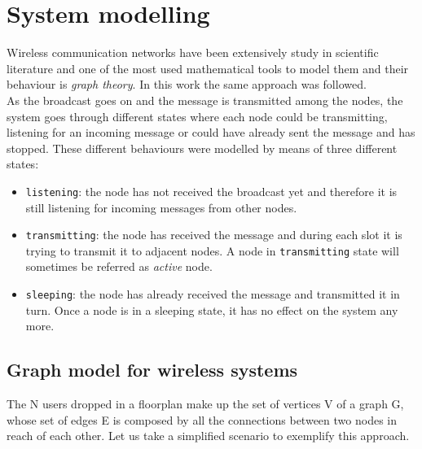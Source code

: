 \chapter{System modelling}
Wireless communication networks have been extensively study in scientific literature and one of the most used mathematical tools to model them and their behaviour is \textit{graph theory}.
In this work the same approach was followed.\\
As the broadcast goes on and the message is transmitted among the nodes, the system goes through different states where each node could be transmitting, listening for an incoming message or could have already sent the message and has stopped.
These different behaviours were modelled by means of three different states:
\begin{itemize}
	\item
	\texttt{listening}: the node has not received the broadcast yet and therefore it is still listening for incoming messages from other nodes.
	\item
	\texttt{transmitting}: the node has received the message and during each slot it is trying to transmit it to adjacent nodes. A node in \texttt{transmitting} state will sometimes be referred as \textit{active} node.
	\item
	\texttt{sleeping}: the node has already received the message and transmitted it in turn. Once a node is in a sleeping state, it has no effect on the system any more.
\end{itemize}


\section{Graph model for wireless systems}

The N users dropped in a floorplan make up the set of vertices V of a graph G, whose set of edges E is composed by all the connections between two nodes in reach of each other. Let us take a simplified scenario to exemplify this approach.

